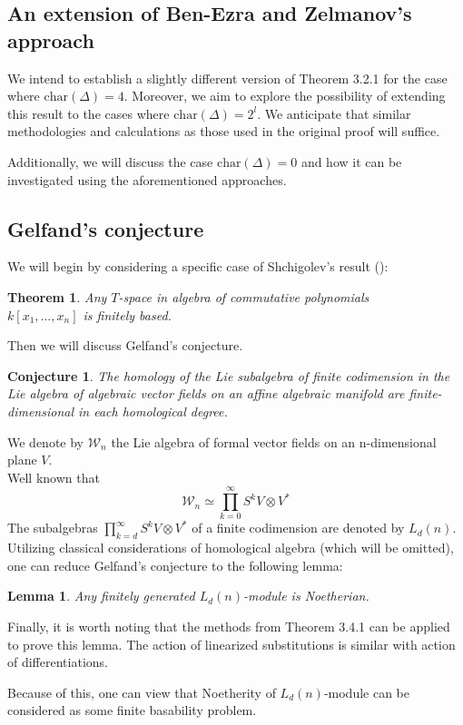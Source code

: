 \documentclass[12pt,a4paper]{article}
\newtheorem{theorem}{Theorem}[subsection]
\newtheorem{lemma}{Lemma}[subsection]
\newtheorem*{conjecture*}{Conjecture}
\begin{document}
    \subsection{An extension of Ben-Ezra and Zelmanov's approach}
    We intend to establish a slightly different version of Theorem 3.2.1 for the case where $\mathrm{char}(\Delta)=4$.
    Moreover, we aim to explore the possibility of extending this result to the cases where $\mathrm{char}(\Delta)=2^l$.
    We anticipate that similar methodologies and calculations as those used in the original proof will suffice.

    Additionally, we will discuss the case $\mathrm{char}(\Delta)=0$ and how it can be investigated using the aforementioned approaches.

    \subsection{Gelfand's conjecture}
    We will begin by considering a specific case of Shchigolev's result (\cite{Shchigolev}):
    \vskip 0.1in\noindent
    \begin{theorem}
        Any  $T$-space in algebra of commutative polynomials \\$k[x_1,\ldots,x_n]$ is finitely based.
    \end{theorem}
    \vskip 0.1in\noindent

    Then we will discuss Gelfand's conjecture.

    \vskip 0.1in\noindent
    \begin{conjecture*}
        The homology of the Lie subalgebra of finite codimension in the Lie algebra of algebraic vector fields on an affine algebraic manifold are finite-dimensional in each
        homological degree.
    \end{conjecture*}
    \vskip 0.1in\noindent

    We denote by $\mathcal{W}_n$ the Lie algebra of formal vector fields on an n-dimensional plane $V$.\\
    Well known that
    \[\mathcal{W}_n\simeq \prod\limits_{k=0}^{\infty}S^k V\otimes V^*\]
    The subalgebras $\prod\limits_{k=d}^{\infty}S^k V\otimes V^*$ of a finite codimension are denoted by $L_d(n)$.
    Utilizing classical considerations of homological algebra (which will be omitted), one can reduce Gelfand's conjecture to the following lemma:
    \vskip 0.1in\noindent
    \begin{lemma}
        Any finitely generated $L_d(n)$-module is Noetherian.
    \end{lemma}
    \vskip 0.1in\noindent

    Finally, it is worth noting that the methods from Theorem 3.4.1 can be applied to prove this lemma.
    The action of linearized  substitutions is similar with action of differentiations.

    Because of this, one can view that Noetherity of $L_d(n)$-module can be considered as some finite basability problem.


    
    
\end{document}
